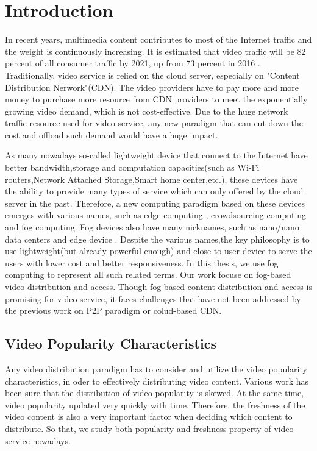 \chapter{Introduction}
\label{chp:introduction}
In recent years, multimedia content contributes to most of the Internet traffic and the weight is
continuously increasing. It is estimated that video traffic will be 82 percent of all consumer traffic by 2021,
up from 73 percent in 2016 \citep{vniciso}. Traditionally, video service is relied on the cloud server,
especially on "Content Distribution Nerwork"(CDN). The video providers have to pay more and more money to purchase
more resource from CDN providers to meet the exponentially growing video demand, which is not
cost-effective. Due to the huge network traffic resource used for video service, any new paradigm that
can cut down the cost and offload such demand would have a huge impact.

As many nowadays so-called lightweight device that connect to the Internet have
 better bandwidth,storage and computation capacities(such as Wi-Fi routers,Network
Attached Storage,Smart home center,etc.), these devices have the ability to provide many
types of service which can only offered by the cloud server in the past. Therefore, a new computing paradigm
based on these devices emerges with various names, such as edge computing \citep{edgecomputing},
crowdsourcing computing \citep{Chen2015Thunder} and fog computing. Fog devices also have many nicknames,
such as nano/nano data centers \citep{Valancius2009Greening} and edge device \citep{Laoutaris2008ECHOS}.
Despite the various names,the key philosophy is to use lightweight(but already powerful enough) and
close-to-user device to serve the users with lower cost and better responsiveness. In this thesis,
we use fog computing to represent all such related terms.
Our work focuse on fog-based video distribution and access. Though fog-based content distribution
and access is promising for video service, it faces challenges that have not been addressed by the
previous work on P2P paradigm or colud-based CDN.

\section{Video Popularity Characteristics}
 Any video distribution paradigm has to consider and utilize the video popularity characteristics,
in oder to effectively distributing video content. Various work has been sure that the distribution
of video popularity is skewed. At the same time, video popularity updated very quickly with
time. Therefore, the freshness of the video  content is also a very important factor when deciding
which content  to distribute. So that, we study both popularity and freshness property of video service
nowadays.
